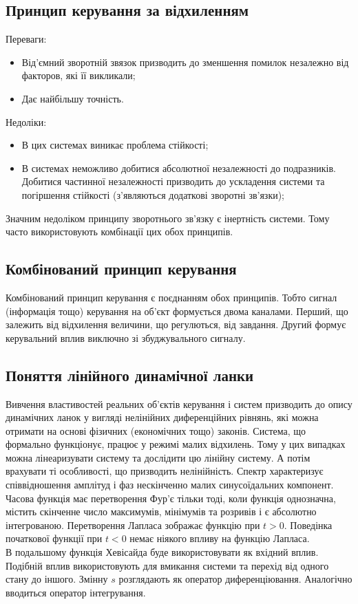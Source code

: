 \subsection{Принцип керування за відхиленням}
Переваги:
\begin{itemize}
\item Від’ємний зворотній звязок призводить до зменшення помилок незалежно від факторов, які її викликали;
\item Дає найбільшу точність.
\end{itemize}
Недоліки:
\begin{itemize}
\item В цих системах виникає проблема стійкості;
\item В системах неможливо добитися абсолютної незалежності до подразників. Добитися частинної незалежності призводить до ускладення системи та погіршення стійкості (з'являються додаткові зворотні зв’язки);
\end{itemize}
Значним недоліком принципу зворотнього зв’язку є інертність системи. %
Тому часто використовують комбінації цих обох принципів.
\subsection{Комбінований принцип керування}
Комбінований принцип керування є поєднанням обох принципів. Тобто сигнал (інформація тощо) керування на об’єкт формується двома каналами. Перший, що залежить від відхилення величини, що регулються, від завдання. Другий формує керувальний вплив виключно зі збуджувального сигналу.
\subsection{Поняття лінійного динамічної ланки}
Вивчення властивостей реальних об’єктів керування і систем призводить до опису динамічних ланок у вигляді нелінійних диференційних рівнянь, які можна отримати на основі фізичних (економічних тощо) законів. Система, що формально функціонує, працює у режимі малих відхилень. Тому у цих випадках можна лінеаризувати систему та дослідити цю лінійну систему. А потім врахувати ті особливості, що призводить нелінійність.
Спектр характеризує співвідношення амплітуд і фаз нескінченно малих синусоїдальних компонент. \\
Часова функція має перетворення Фур’є тільки тоді, коли функція однозначна, містить скінченне число максимумів, мінімумів та розривів і є абсолютно інтегрованою. 
Перетворення Лапласа зображає функцію при $t>0$. Поведінка початкової функції при $t<0$ немає ніякого впливу на функцію Лапласа.\\
В подальшому функція Хевісайда буде використовувати як вхідний вплив. Подібній вплив використовують для вмикання системи та перехід від одного стану до іншого. Змінну $s$ розглядають як оператор диференціювання. Аналогічно вводиться оператор інтегрування.
